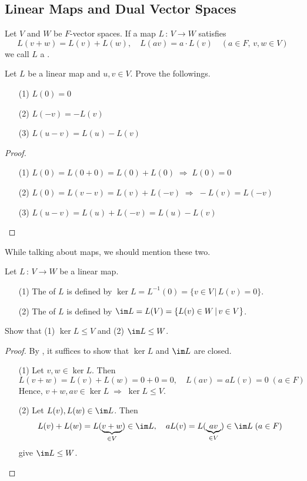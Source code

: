 \documentclass[a4paper, 10pt]{article}
\begin{document}
\subsection{Linear Maps and Dual Vector Spaces}
\begin{definition}
    Let $V$ and $W$ be $F$-vector spaces. If a map $L \,:\, V \rightarrow W$ satisfies
    \[ L(v+w) = L(v) + L(w), \quad L(av) = a\cdot L(v) \quad (a \in F, \, v, w \in V) \]
    we call $L$ a .
\end{definition}
\begin{exer}
    Let $L$ be a linear map and $u, v \in V$. Prove the followings.
    \begin{itemize}
        \item[(1)] $L(0) = 0$
        \item[(2)] $L(-v) = -L(v)$
        \item[(3)] $L(u-v) = L(u) - L(v)$
    \end{itemize}
\end{exer}
\begin{proof}
    \begin{itemize}
        \item[(1)] $L(0) = L(0+0) = L(0) + L(0) \;\Longrightarrow\; L(0) = 0$
        \item[(2)] $L(0) = L(v-v) = L(v) + L(-v) \;\Longrightarrow\; -L(v) = L(-v)$
        \item[(3)] $L(u-v) = L(u) + L(-v) = L(u) - L(v)$
    \end{itemize}
\end{proof}
While talking about maps, we should mention these two.
\begin{definition}
    Let $L \,:\, V \rightarrow W$ be a linear map.
    \begin{itemize}
        \item[(1)] The  of $L$ is defined by $\ker L = L^{-1}(0) = \{ v \in V \,|\, L(v) = 0 \}$.
        \item[(2)] The  of $L$ is defined by $\im L = L(V) = \{ L(v) \in W \,|\, v \in V \}$.
    \end{itemize}
\end{definition}
\begin{exer}
    Show that (1) $\ker L \leq V$ and (2) $\im L \leq W$.
\end{exer}
\begin{proof}
    By , it suffices to show that $\ker L$ and $\im L$ are closed.
    \begin{itemize}
        \item[(1)] Let $v, w \in \ker L$. Then
        \[ L(v + w) = L(v) + L(w) = 0 + 0 = 0, \quad L(av) = aL(v) = 0 \; (a \in F) \]
        Hence, $v + w, av \in \ker L \;\Longrightarrow\; \ker L \leq V$.
        \item[(2)] Let $L(v), L(w) \in \im L$. Then
        \[ L(v) + L(w) = L(\underbrace{v+w}_{\in V}) \in \im L, \quad aL(v) = L(\underbrace{av}_{\in V}) \in \im L \; (a \in F) \]
        give $\im L \leq W$.
    \end{itemize}
\end{proof}
\newpage
\end{document}

